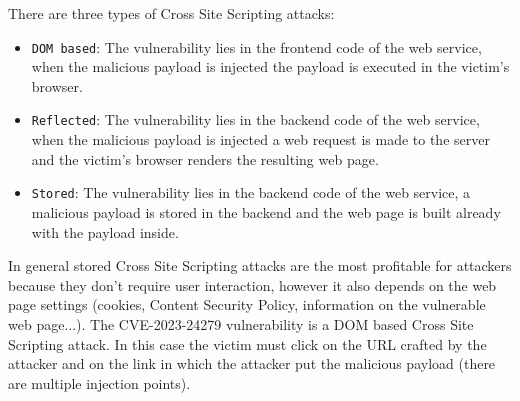 There are three types of Cross Site Scripting attacks:
\begin{itemize}
    \item \texttt{DOM based}: The vulnerability lies in the frontend code of the web service, when the malicious payload is injected the payload is executed in the victim's browser.
    \item \texttt{Reflected}: The vulnerability lies in the backend code of the web service, when the malicious payload is injected a web request is made to the server and the victim's browser renders the resulting web page.
    \item \texttt{Stored}: The vulnerability lies in the backend code of the web service, a malicious payload is stored in the backend and the web page is built already with the payload inside.
\end{itemize}

In general stored Cross Site Scripting attacks are the most profitable for attackers because they don't require user interaction, however it also depends on the web page settings (cookies, Content Security Policy, information on the vulnerable web page...). The CVE-2023-24279 vulnerability is a DOM based Cross Site Scripting attack. In this case the victim must click on the URL crafted by the attacker and on the link in which the attacker put the malicious payload (there are multiple injection points).
\medskip

